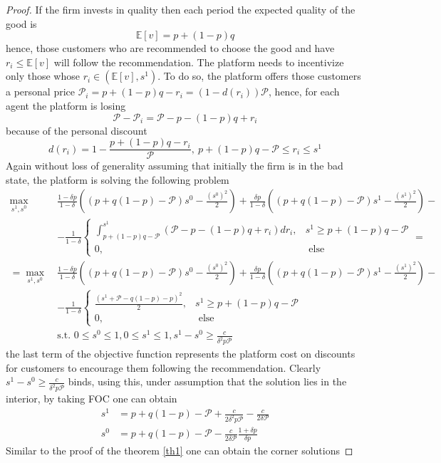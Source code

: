 \documentclass[a4paper]{article}
\newcommand{\expect}{\mathbb{E}}
\begin{document}
\begin{proof}
	If the firm invests in quality then each period the expected quality of the good is $$\expect[v] = p + (1-p)q$$
	hence, those customers who are recommended to choose the good and have $r_i \le \expect[v]$ will follow the recommendation. The platform needs to incentivize only those whose $r_i \in (\expect[v], s^1)$. To do so, the platform offers those customers a personal price $\mathcal{P}_i  = p+(1-p)q - r_i = (1-d(r_i)) \mathcal{P}$, hence, for each agent the platform is losing $$\mathcal{P} - \mathcal{P}_i = \mathcal{P} -  p-(1-p)q + r_i$$ because of the personal discount
	$$d(r_i) = 1 - \frac{p+(1-p)q - r_i}{\mathcal{P}},\ p+(1-p)q - \mathcal{P} \le r_i \le s^1$$
	Again without loss of generality assuming that initially the firm is in the bad state, the platform is solving the following problem 
	\begin{align*} \underset{s^1, s^0}{\max}\ &\frac{1-\delta p}{1-\delta}\left((p + q(1-p) - \mathcal{P})s^0 - \frac{(s^0)^2}{2}\right) + \frac{\delta p}{1-\delta}\left((p + q(1-p) - \mathcal{P})s^1 - \frac{(s^1)^2}{2}\right) - \\
	&- \frac{1}{1-\delta} \begin{cases} \int_{p+(1-p)q - \mathcal{P}}^{s^1} (\mathcal{P} -  p-(1-p)q + r_i)dr_i, &s^1 \ge p+(1-p)q - \mathcal{P} \\ 0, &\text{ else }\end{cases} = \\
	= \underset{s^1, s^0}{\max}\ &\frac{1-\delta p}{1-\delta}\left((p + q(1-p) - \mathcal{P})s^0 - \frac{(s^0)^2}{2}\right) + \frac{\delta p}{1-\delta}\left((p + q(1-p) - \mathcal{P})s^1 - \frac{(s^1)^2}{2}\right) - \\
	&- \frac{1}{1-\delta} \begin{cases} \frac{(s^1 + \mathcal{P} - q (1 - p) - p)^2}{2}, &s^1 \ge p+(1-p)q - \mathcal{P} \\ 0, &\text{ else }\end{cases}\\
	&\text{s.t. } 0\le s^0\le 1, 0 \le s^1 \le 1, s^1 - s^0 \ge \frac{c}{\delta^2 p \mathcal{P}}
	\end{align*}
	the last term of the objective function represents the platform cost on discounts for customers to encourage them following the recommendation. Clearly $s^1 - s^0 \ge \frac{c}{\delta^2 p \mathcal{P}}$ binds, using this, under assumption that the solution lies in the interior, by taking FOC one can obtain 
	\begin{align*} s^1 &= p + q(1-p) - \mathcal{P} + \frac{c}{2 \delta^2 p \mathcal{P}} - \frac{c}{2 \delta \mathcal{P}}\\
	 s^0 &= p + q(1-p) - \mathcal{P} - \frac{c}{2 \delta \mathcal{P}} \frac{1+\delta p}{\delta p}
	 \end{align*}
	 Similar to the proof of the theorem \ref{th1} one can obtain the corner solutions
\end{proof}
\end{document}
